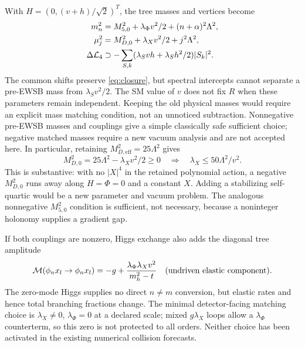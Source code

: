 \documentclass[11pt,a4paper]{article}
\begin{document}
With $H=(0,(v+h)/\sqrt2)^T$, the tree masses and vertices become
\begin{align}
 m_n^2&=M_{5,0}^2+\lambda_\Phi v^2/2+(n+\alpha)^2\Lambda^2,\\
 \mu_j^2&=M_{D,0}^2+\lambda_X v^2/2+j^2\Lambda^2,\\
 \Delta{\cal L}_4&\supset-\sum_{S,k}
   (\lambda_S v h+\lambda_S h^2/2)|S_k|^2.
\end{align}
The common shifts preserve \eqref{eq:closure}, but spectral intercepts
cannot separate a pre-EWSB mass from $\lambda_Sv^2/2$. The SM value of
$v$ does not fix $R$ when these parameters remain independent. Keeping
the old physical masses would require an explicit mass matching
condition, not an unnoticed subtraction. Nonnegative pre-EWSB masses
and couplings give a simple classically safe sufficient choice; negative
matched masses require a new vacuum analysis and are not accepted here.
In particular, retaining $M_{D,\mathrm{eff}}^2=25\Lambda^2$ gives
\begin{equation}\label{eq:stability}
 M_{D,0}^2=25\Lambda^2-\lambda_Xv^2/2\geq0
 \quad\Longrightarrow\quad \lambda_X\leq50\Lambda^2/v^2.
\end{equation}
This is substantive: with no $|X|^4$ in the retained polynomial action,
a negative $M_{D,0}^2$ runs away along $H=\Phi=0$ and a constant $X$.
Adding a stabilizing self-quartic would be a new parameter and vacuum
problem. The analogous nonnegative $M_{5,0}^2$ condition is sufficient,
not necessary, because a noninteger holonomy supplies a gradient gap.

If both couplings are nonzero, Higgs exchange also adds the diagonal
tree amplitude
\begin{equation}
 {\cal M}(\phi_n x_l\to\phi_n x_l)
 =-g+\frac{\lambda_\Phi\lambda_Xv^2}{m_h^2-t}
 \quad\hbox{(undriven elastic component)}.
\end{equation}
The zero-mode Higgs supplies no direct $n\ne m$ conversion, but elastic
rates and hence total branching fractions change. The minimal
detector-facing matching choice is $\lambda_X\ne0$, $\lambda_\Phi=0$
at a declared scale; mixed $g\lambda_X$ loops allow a $\lambda_\Phi$
counterterm, so this zero is not protected to all orders. Neither choice
has been activated in the existing numerical collision forecasts.
\end{document}
